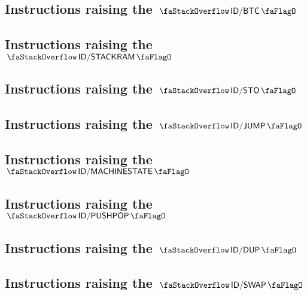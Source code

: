 \subsection{Instructions raising the $\stackDecBtcFlag$          \lispDone{}}   \label{hub: instruction handling: btc}                     
\subsection{Instructions raising the $\stackDecStackRamFlag$     \lispDone{}}   \label{hub: instruction handling: stackRam}                
\subsection{Instructions raising the $\stackDecStoFlag$          \lispDone{}}   \label{hub: instruction handling: sto}                     
\subsection{Instructions raising the $\stackDecJumpFlag$         \lispDone{}}   \label{hub: instruction handling: jump}                    
\subsection{Instructions raising the $\stackDecMachineStateFlag$ \lispDone{}}   \label{hub: instruction handling: machineState}            
\subsection{Instructions raising the $\stackDecPushPopFlag$      \lispDone{}}   \label{hub: instruction handling: pushPop}                 
\subsection{Instructions raising the $\stackDecDupFlag$          \lispDone{}}   \label{hub: instruction handling: dup}                     
\subsection{Instructions raising the $\stackDecSwapFlag$         \lispDone{}}   \label{hub: instruction handling: swap}                    
